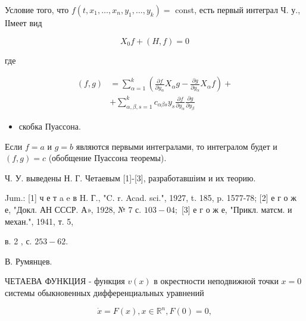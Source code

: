 \documentclass[10pt]{article}
\begin{document}
Условие того, что $f\left(t, x_{1}, \ldots, x_{n}, y_{1}, \ldots, y_{k}\right)=$ const, есть первый интеграл Ч. у., ІІмеет вид



\[

X_{0} f+(H, f)=0

\]



где



\[

\begin{aligned}

(f, g) & =\sum_{\alpha=1}^{k}\left(\frac{\partial f}{\partial y_{\alpha}} X_{\alpha} g-\frac{\partial g}{\partial y_{\alpha}} X_{\alpha} f\right)+ \\

& +\sum_{\alpha, \beta, s=1}^{k} c_{\alpha \beta s} y_{s} \frac{\partial f}{\partial y_{\alpha}} \frac{\partial g}{\partial y_{\beta}}

\end{aligned}

\]



\begin{itemize}

  \item скобка Пуассона.

\end{itemize}



Если $f=a$ и $g=b$ являются первыми интегралами, то интегралом будет и $(f, g)=c$ (обобщение Пуассона теоремы).



Ч. У. выведены Н. Г. Четаевым [1]-[3], разработавшіим и их теорию.



Jum.: [1] ч е т a e в H. Г., "C. r. Acad. sci.", 1927, t. 185, p. 1577-78; [2] е г о ж е, "Докл. АН СССР. А», 1928, № 7 с. $103-04 ;$ [3] е г о ж е, "Прикл. матсм. и механ.", 1941, т. 5,

в. 2 , с. $253-62$.

В. Румянцев.



ЧЕТАЕВА ФУНКЦИЯ - функция $v(x)$ в окрестности неподвижной точки $x=0$ системы обыкновенных дифференциальных уравнений



\[

\dot{x}=F(x), x \in \mathbb{R}^{n}, F(0)=0,

\]
\end{document}
